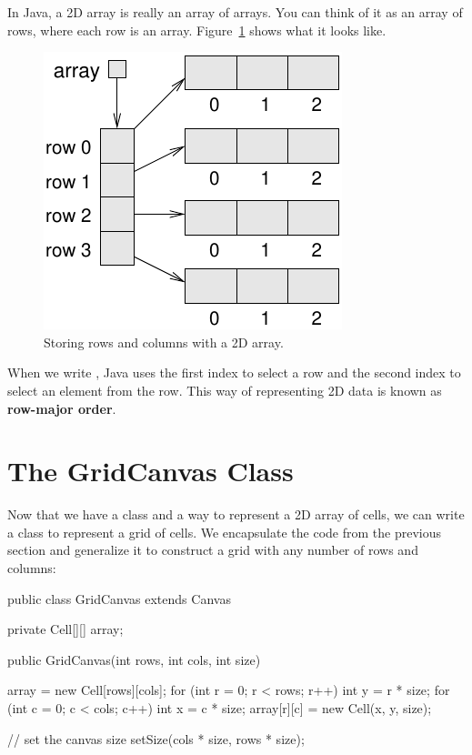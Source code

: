 In Java, a 2D array is really an array of arrays.
You can think of it as an array of rows, where each row is an array.
Figure~\ref{fig:2D-array} shows what it looks like.

\begin{figure}[!ht]
\begin{center}
\includegraphics{figs/2D-array.pdf}
\caption{Storing rows and columns with a 2D array.}
\label{fig:2D-array}
\end{center}
\end{figure}


When we write , Java uses the first index to select a row and the second index to select an element from the row.
This way of representing 2D data is known as {\bf row-major order}.


\section{The GridCanvas Class}

Now that we have a  class and a way to represent a 2D array of cells, we can write a class to represent a grid of cells.
We encapsulate the code from the previous section and generalize it to construct a grid with any number of rows and columns:

\begin{code}
public class GridCanvas extends Canvas {
    private Cell[][] array;

    public GridCanvas(int rows, int cols, int size) {
        array = new Cell[rows][cols];
        for (int r = 0; r < rows; r++) {
            int y = r * size;
            for (int c = 0; c < cols; c++) {
                int x = c * size;
                array[r][c] = new Cell(x, y, size);
            }
        }

        // set the canvas size
        setSize(cols * size, rows * size);
    }
}
\end{code}

